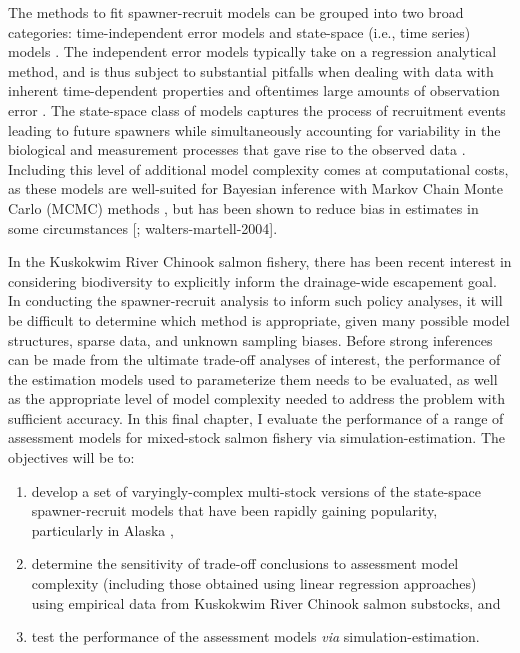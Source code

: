 \documentclass[12pt,]{book}
\theoremstyle{definition}
\theoremstyle{definition}
\theoremstyle{definition}
\theoremstyle{remark}
\begin{document}
The methods to fit spawner-recruit models can be grouped into two broad
categories: time-independent error models
\citep[i.e.,][]{clark-etal-2009} and state-space (i.e., time series)
models \citep{fleischman-etal-2013, su-peterman-2012}. The independent
error models typically take on a regression analytical method, and is
thus subject to substantial pitfalls when dealing with data with
inherent time-dependent properties and oftentimes large amounts of
observation error \citep{walters-martell-2004}. The state-space class of
models captures the process of recruitment events leading to future
spawners while simultaneously accounting for variability in the
biological and measurement processes that gave rise to the observed data
\citep{devalpine-hastings-2002, fleischman-etal-2013}. Including this
level of additional model complexity comes at computational costs, as
these models are well-suited for Bayesian inference with Markov Chain
Monte Carlo (MCMC) methods \citep[Ch. 4]{newman-etal-2014}, but has been
shown to reduce bias in estimates in some circumstances
{[}\citet{su-peterman-2012}; walters-martell-2004{]}.

In the Kuskokwim River Chinook salmon fishery, there has been recent
interest in considering biodiversity to explicitly inform the
drainage-wide escapement goal. In conducting the spawner-recruit
analysis to inform such policy analyses, it will be difficult to
determine which method is appropriate, given many possible model
structures, sparse data, and unknown sampling biases. Before strong
inferences can be made from the ultimate trade-off analyses of interest,
the performance of the estimation models used to parameterize them needs
to be evaluated, as well as the appropriate level of model complexity
needed to address the problem with sufficient accuracy. In this final
chapter, I evaluate the performance of a range of assessment models for
mixed-stock salmon fishery via simulation-estimation. The objectives
will be to:

\begin{enumerate}
\def\labelenumi{(\arabic{enumi})}
\item
  develop a set of varyingly-complex multi-stock versions of the
  state-space spawner-recruit models that have been rapidly gaining
  popularity, particularly in Alaska
  \citep[\citet{fleischman-etal-2013},
  \citet{staton-etal-2017}]{walters-martell-2004, su-peterman-2012},
\item
  determine the sensitivity of trade-off conclusions to assessment model
  complexity (including those obtained using linear regression
  approaches) using empirical data from Kuskokwim River Chinook salmon
  substocks, and
\item
  test the performance of the assessment models \emph{via}
  simulation-estimation.
\end{enumerate}
\end{document}

